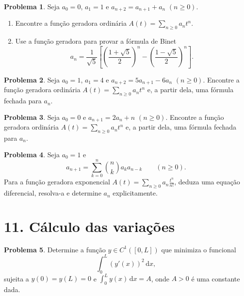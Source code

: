 \documentclass[10pt,a4paper]{amsart}
\renewcommand{\d}{\mathrm{d}}
\theoremstyle{definition}
\newtheorem{problema}{Problema}
\begin{document}
\begin{problema}
Seja $a_0=0$, $a_1=1$ e $a_{n+2}=a_{n+1}+a_n$ $(n\ge 0)$.
\begin{enumerate}[label=(\alph*)]
    \item Encontre a função geradora ordinária $A(t)=\sum_{n\ge 0}a_nt^n$.
    \item Use a função geradora para provar a fórmula de Binet
    \[
        a_n=\frac{1}{\sqrt5}\left[
        \left(\frac{1+\sqrt5}{2}\right)^n
        -\left(\frac{1-\sqrt5}{2}\right)^n
        \right].
    \]
\end{enumerate}
\end{problema}

\begin{problema}
Seja $a_0=1$, $a_1=4$ e $a_{n+2}=5a_{n+1}-6a_n$ $(n\ge 0)$. Encontre a
função geradora ordinária $A(t)=\sum_{n\ge 0}a_nt^n$ e, a partir dela, uma
fórmula fechada para $a_n$.
\end{problema}

\begin{problema}
Seja $a_0=0$ e $a_{n+1}=2a_n+n$ $(n\ge 0)$. Encontre a função geradora
ordinária $A(t)=\sum_{n\ge 0}a_nt^n$ e, a partir dela, uma fórmula fechada
para $a_n$.
\end{problema}

\begin{problema}
Seja $a_0=1$ e
\[
    a_{n+1}=\sum_{k=0}^n \binom{n}{k}a_ka_{n-k}
    \qquad(n\ge 0).
\]
Para a função geradora exponencial $A(t)=\sum_{n\ge 0}a_n\frac{t^n}{n!}$,
deduza uma equação diferencial, resolva-a e determine $a_n$ explicitamente.
\end{problema}

\section*{11. Cálculo das variações}

\begin{problema}
Determine a função $y\in C^1([0,L])$ que minimiza o funcional
\[
    \int_0^L (y'(x))^2\,\d x,
\]
sujeita a $y(0)=y(L)=0$ e $\int_0^L y(x)\,\d x=A$, onde $A>0$ é uma
constante dada.
\end{problema}
\end{document}
